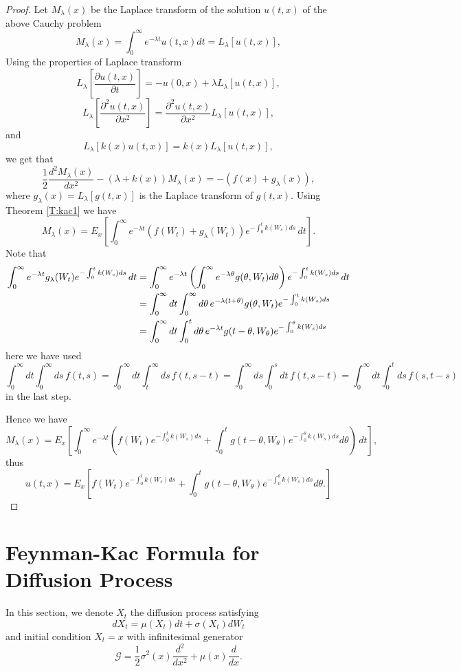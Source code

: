 \begin{proof}
Let $M_{\lambda}(x)$ be the Laplace transform of the solution $u(t,x)$  of the
above Cauchy problem
\[
  M_{\lambda}(x) = \int_0^{\infty} e^{-\lambda t} u(t,x) dt 
    = L_{\lambda}[u(t,x)],
\]
Using the properties of Laplace transform 
\[
  L_{\lambda}\left[\frac{\partial u(t,x)}{\partial t} \right]
    = - u(0,x) + \lambda L_{\lambda}[u(t,x)],
\]
\[
  L_{\lambda}\left[\frac{\partial^2 u(t,x)}{\partial x^2} \right]
    = \frac{\partial^2 u(t,x)}{\partial x^2} L_{\lambda}[u(t,x)],
\]
and 
\[
    L_{\lambda}[k(x) u(t,x)] = k(x) L_{\lambda}[u(t,x)],
\]
we get that 
\[
  \frac{1}{2} \frac{d^2 M_{\lambda}(x)}{dx^2} - (\lambda+k(x)) M_{\lambda}(x)
    = -( f(x)  + g_{\lambda}(x) ),
\]
where $g_{\lambda}(x) = L_{\lambda}[g(t,x)]$ is the Laplace transform of 
$g(t,x)$.
Using Theorem \ref{T:kac1} we have
\[
  M_{\lambda}(x) = E_x 
        \left[
          \int_0^{\infty} e^{-\lambda t} ( f(W_t) + g_{\lambda}(W_t) )
            e^{-\int_0^t k(W_s) ds} \, dt 
        \right].
\]
Note that
\begin{align*}
  \int_0^{\infty} e^{-\lambda t} g_{\lambda}(W_t) e^{-\int_0^t k(W_s) ds} \, dt 
  &= \int_0^{\infty} e^{-\lambda t}  
       \left( \int_0^{\infty} e^{-\lambda\theta} g(\theta,W_t) d\theta \right)
     e^{-\int_0^t k(W_s) ds} \, dt    \notag \\
  &= \int_0^{\infty} dt \int_0^{\infty} d\theta \,
       e^{-\lambda (t+\theta)} g(\theta,W_t) e^{-\int_0^t k(W_s) ds} 
     \notag \\
  &= \int_0^{\infty} dt \int_0^t d\theta \,
       e^{-\lambda t} g(t-\theta,W_{\theta}) e^{-\int_0^{\theta} k(W_s) ds} 
\end{align*}
here we have used
\[
  \int_0^{\infty} dt \int_0^{\infty} ds \,f(t,s)
  = \int_0^{\infty} dt \int_t^{\infty} ds \,f(t,s-t)
  = \int_0^{\infty} ds \int_0^s dt \,f(t,s-t)
  = \int_0^{\infty} dt \int_0^t ds \,f(s,t-s)
\]
in the last step.

Hence we have
\[
  M_{\lambda}(x) = E_x 
    \left[
      \int_0^{\infty} e^{-\lambda t} 
      \left( 
         f(W_t) e^{-\int_0^t k(W_s) ds} 
         + \int_0^t g(t-\theta,W_{\theta}) e^{-\int_0^{\theta}k(W_s)ds} d\theta
      \right)  \, dt 
    \right],
\]
thus 
\[
  u(t,x)=E_x 
    \left[
      f(W_t) e^{-\int_0^t k(W_s) ds}
      + \int_0^t g(t-\theta,W_{\theta}) e^{-\int_0^{\theta} k(W_s) ds} d\theta.
    \right]
\]
\end{proof}


\section{Feynman-Kac Formula for Diffusion Process}
In this section, we denote $X_t$ the diffusion process satisfying 
\begin{equation}
  dX_t = \mu(X_t) dt + \sigma(X_t) dW_t
\end{equation}
and initial condition $X_t=x$ with infinitesimal generator
\begin{equation}
  \mathcal{G} = \frac{1}{2} \sigma^2(x) \frac{d^2}{dx^2} + \mu(x)\frac{d}{dx}.
\end{equation}

